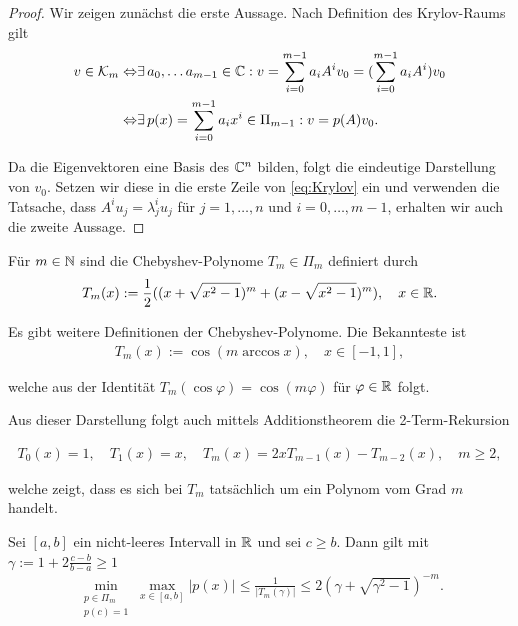 \documentclass{article}
\begin{document}
\begin{theorem}
\begin{proof}
	Wir zeigen zunächst die erste Aussage. Nach Definition des Krylov-Raums gilt
	\begin{align}
		v \in \mathcal{K}_m \Leftrightarrow& \exists \, a_0, \dots a_{m-1} \in \mathbb{C}: v = \sum_{i=0}^{m-1} a_i A^i v_0 = (\sum_{i=0}^{m-1} a_i A^i)v_0\\
		\Leftrightarrow& \exists \, p(x) = \sum_{i=0}^{m-1} a_i x^i \in \Pi_{m-1}: v = p(A)v_0.
		\label{eq:Krylov}
	\end{align}

	Da die Eigenvektoren eine Basis des $\mathbb{C}^n$ bilden, folgt die eindeutige Darstellung von $v_0$. Setzen wir diese in die erste Zeile von \ref{eq:Krylov} ein und verwenden die Tatsache, dass $A^i u_j = \lambda_j^i u_j$ für $j=1,\dots, n $ und $i = 0, \dots, m-1$, erhalten wir auch die zweite Aussage.
\end{proof}


\begin{definition}
	Für $m \in \mathbb{N}$ sind die Chebyshev-Polynome $T_m \in \Pi_m$ definiert durch
	\begin{align}\label{chebyshev}
		T_m(x) := \frac{1}{2}((x+ \sqrt{x^2 - 1})^m + (x- \sqrt{x^2 - 1})^m), \quad x \in \mathbb{R}.
	\end{align}
\end{definition}

Es gibt weitere Definitionen der Chebyshev-Polynome. Die Bekannteste ist
\begin{align}\label{chebyalt}
	T_m(x) := \cos(m \arccos x), \quad x \in [-1,1],
\end{align}

welche aus der Identität $T_m(\cos \varphi) = \cos (m \varphi)$ für $\varphi \in \mathbb{R}$ folgt.

Aus dieser Darstellung folgt auch mittels Additionstheorem die 2-Term-Rekursion

\begin{align*}
	T_0(x) = 1, \quad T_1(x) = x, \quad T_{m}(x) = 2x T_{m-1}(x) - T_{m-2}(x), \quad m \geq 2,
\end{align*}

welche zeigt, dass es sich bei $T_m$ tatsächlich um ein Polynom vom Grad $m$ handelt.

\begin{lemma}
	\label{lem:polminmax}
	Sei $[a,b]$ ein nicht-leeres Intervall in $\mathbb{R}$ und sei $c \geq b$. Dann gilt mit $\gamma := 1 + 2 \frac{c-b}{b-a} \geq 1$
	\begin{align}\label{polminmax}
		\min_{\substack{p \in \Pi_m \\
		p(c) = 1}} \max_{x \in [a,b]} |p(x)| \leq \frac{1}{|T_m(\gamma)|} \leq 2 (\gamma + \sqrt{\gamma^2 -1})^{-m}.
	\end{align}
\end{lemma}


\end{theorem}
\end{document}
